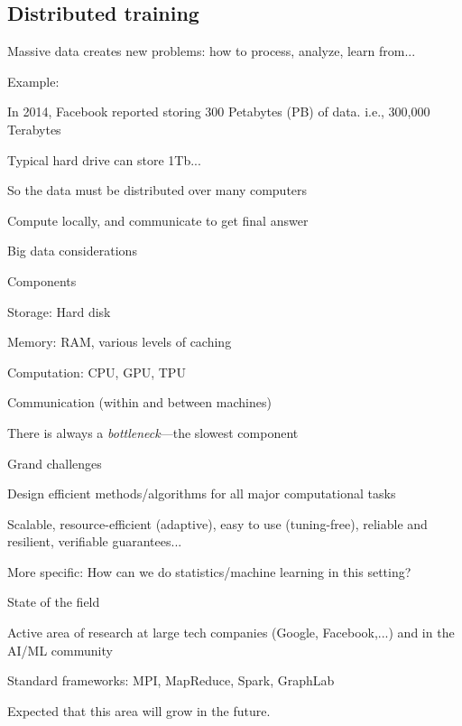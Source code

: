 \documentclass[english]{article}
\begin{document}
\eitem 



\subsection{Distributed training}


\benum 

\item Massive data creates new problems: how to process, analyze, learn from...
\item Example: 
\bitem
\item In 2014, Facebook reported storing 300 Petabytes (PB) of data. i.e., 300,000 Terabytes
\item Typical hard drive can store 1Tb...
\item So the data must be distributed over many computers
\item Compute locally, and communicate to get final answer
\eitem



\item {Big data considerations}
\bitem
\item Components
\bitem
\item Storage: Hard disk 
\item Memory: RAM, various levels of caching
\item Computation: CPU, GPU, TPU
\item Communication (within and between machines)
\eitem
\item There is always a \emph{bottleneck}---the slowest component
\eitem




\item {Grand challenges}
\bitem
\item Design efficient methods/algorithms for all major computational tasks
\item Scalable, resource-efficient (adaptive), easy to use (tuning-free), reliable and resilient, verifiable guarantees...
\item More specific: How can we do statistics/machine learning in this setting? 
\eitem




\item {State of the field}
\bitem
\item Active area of research at large tech companies (Google, Facebook,...) and in the AI/ML community
\item Standard frameworks: MPI, MapReduce, Spark, GraphLab
\item Expected that this area will grow in the future. 
\eitem
\end{document}
